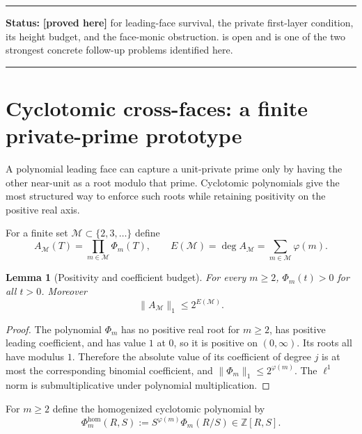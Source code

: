 \documentclass[11pt,oneside]{article}
\newtheorem{lemma}[theorem]{Lemma}
\theoremstyle{definition}
\theoremstyle{remark}
\newcommand{\Z}{\mathbb Z}
\newcommand{\statusproved}{\textcolor{provedgreen}{\textbf{[proved here]}}}
\newenvironment{statusbox}[1]
{\begin{center}\begin{minipage}{0.94\textwidth}\raggedright\hrule\vspace{0.45em}
\textbf{Status:} #1\par\vspace{0.35em}}
{\vspace{0.35em}\hrule\end{minipage}\end{center}}
\begin{document}
\begin{statusbox}{\statusproved{} for leading-face survival, the private first-layer
condition, its height budget, and the face-monic obstruction.  \Cref{target:iterated-face} is
open and is one of the two strongest concrete follow-up problems identified here.}
\end{statusbox}

\section{Cyclotomic cross-faces: a finite private-prime prototype}
\label{sec:cyclotomic-faces}

A polynomial leading face can capture a unit-private prime only by having the other near-unit
as a root modulo that prime.  Cyclotomic polynomials give the most structured way to enforce
such roots while retaining positivity on the positive real axis.

For a finite set $\mathcal M\subset\{2,3,\ldots\}$ define
\begin{equation}
 A_{\mathcal M}(T)=\prod_{m\in\mathcal M}\Phi_m(T),
 \qquad
 E(\mathcal M)=\deg A_{\mathcal M}=\sum_{m\in\mathcal M}\varphi(m).
 \label{eq:cyclotomic-cover-poly}
\end{equation}

\begin{lemma}[Positivity and coefficient budget]
\label{lem:cyclotomic-positive}
For every $m\ge2$, $\Phi_m(t)>0$ for all $t>0$.  Moreover
\begin{equation}
 \|A_{\mathcal M}\|_1\le2^{E(\mathcal M)}.
 \label{eq:cyclotomic-l1}
\end{equation}
\end{lemma}

\begin{proof}
The polynomial $\Phi_m$ has no positive real root for $m\ge2$, has positive leading
coefficient, and has value $1$ at $0$, so it is positive on $(0,\infty)$.  Its roots all have
modulus $1$.  Therefore the absolute value of its coefficient of degree $j$ is at most the
corresponding binomial coefficient, and $\|\Phi_m\|_1\le2^{\varphi(m)}$.  The $\ell^1$ norm
is submultiplicative under polynomial multiplication.
\end{proof}

For $m\ge2$ define the homogenized cyclotomic polynomial by
\begin{equation}
 \Phi_m^{\mathrm{hom}}(R,S):=S^{\varphi(m)}\Phi_m(R/S)\in\Z[R,S].
 \label{eq:hom-cyclotomic}
\end{equation}
\end{document}
